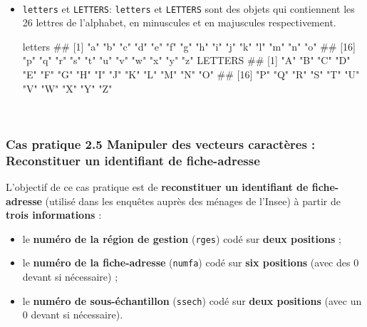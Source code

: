 \documentclass[12pt,twosided, notitlepage]{book}
\newenvironment{Shaded}{}{}
\newcommand{\NormalTok}[1]{{#1}}
\providecommand{\tightlist}{%
  \setlength{\itemsep}{0pt}\setlength{\parskip}{0pt}}
\renewenvironment{Shaded}{\begin{snugshade}}{\end{snugshade}}
\begin{document}
~

\begin{itemize}
\item
  \texttt{letters} et \texttt{LETTERS}: \texttt{letters} et
  \texttt{LETTERS} sont des objets qui contiennent les 26 lettres de
  l'alphabet, en minuscules et en majuscules respectivement.

\begin{Shaded}
\begin{Highlighting}[]
\NormalTok{letters}
  \NormalTok{##  [1] "a" "b" "c" "d" "e" "f" "g" "h" "i" "j" "k" "l" "m" "n" "o"}
  \NormalTok{## [16] "p" "q" "r" "s" "t" "u" "v" "w" "x" "y" "z"}
\NormalTok{LETTERS}
  \NormalTok{##  [1] "A" "B" "C" "D" "E" "F" "G" "H" "I" "J" "K" "L" "M" "N" "O"}
  \NormalTok{## [16] "P" "Q" "R" "S" "T" "U" "V" "W" "X" "Y" "Z"}
\end{Highlighting}
\end{Shaded}
\end{itemize}

~

\subsubsection{\texorpdfstring{\textbf{Cas pratique 2.5} Manipuler des
vecteurs caractères : Reconstituer un identifiant de
fiche-adresse}{Cas pratique 2.5 Manipuler des vecteurs caractères : Reconstituer un identifiant de fiche-adresse}}\label{cas-pratique-2.5-manipuler-des-vecteurs-caracteres-reconstituer-un-identifiant-de-fiche-adresse}

L'objectif de ce cas pratique est de \textbf{reconstituer un identifiant
de fiche-adresse} (utilisé dans les enquêtes auprès des ménages de
l'Insee) à partir de \textbf{trois informations} :

\begin{itemize}
\tightlist
\item
  le \textbf{numéro de la région de gestion} (\texttt{rges}) codé sur
  \textbf{deux positions} ;
\item
  le \textbf{numéro de la fiche-adresse} (\texttt{numfa}) codé sur
  \textbf{six positions} (avec des 0 devant si nécessaire) ;
\item
  le \textbf{numéro de sous-échantillon} (\texttt{ssech}) codé sur
  \textbf{deux positions} (avec un 0 devant si nécessaire).
\end{itemize}
\end{document}
